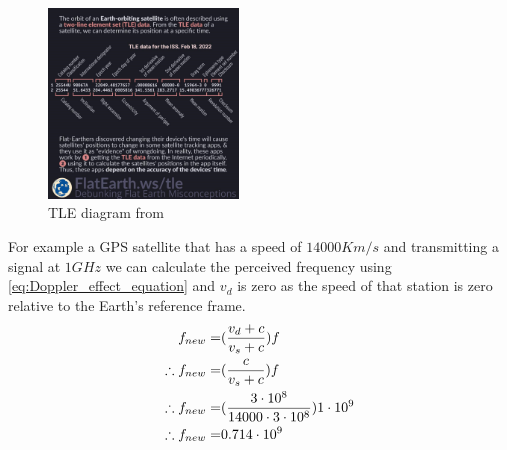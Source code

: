 \documentclass[conference]{IEEEtran}
\begin{document}
\begin{figure}[h]
\centering
	\includegraphics[width = 0.45\textwidth]{TLE.png}
	\caption{TLE diagram from \cite{TLE_flat_earth}}
	\label{fig:TLE}
\end{figure}

For example a GPS satellite that has a speed of $14000 Km/s$ and transmitting a signal at $1G Hz$ we can calculate the perceived frequency using \ref{eq:Doppler_effect_equation} and $v_d$ is zero as the speed of that station is zero relative to the Earth's reference frame.\\

\begin{equation}
\centering
\begin{split}
f_{new} =& (\frac{v_d+c}{v_s+c}) f\\
\therefore f_{new} =& (\frac{c}{v_s+c})f\\
\therefore f_{new} = &(\frac{3\cdot 10^8}{14000 \cdot 3\cdot10^8}) 1\cdot 10^9\\
\therefore f_{new} =& 0.714\cdot  10^9
\end{split}
\label{eq:Doppler_example}
\end{equation}

\label{sec:Orbital}


\end{document}
